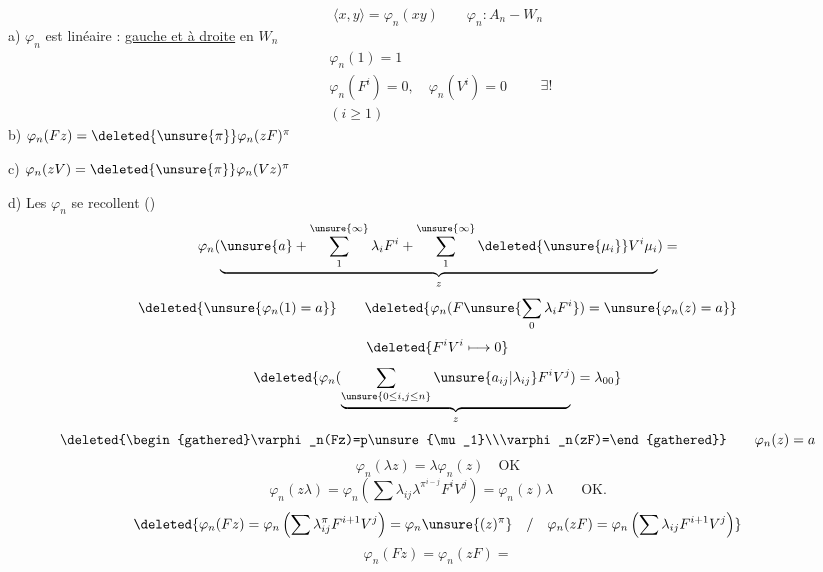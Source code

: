 \[
\langle x,y\rangle=\varphi_n(xy)\qquad \varphi_n:A_n\mathbin{-}W_n
\]
a) $\varphi_n$ est  linéaire : \uline{gauche et à droite} en $W_n$
\[
\boxed{\begin{gathered}\varphi_n(1)=1\\\varphi_n(F^i)=0,\quad\varphi_n(V^i)=0\\(i\geq1)\end{gathered}}\qquad \exists!
\]
b) $\varphi_n(Fz)=\deleted{\unsure{\pi}}\varphi_n(zF)^\pi$


c) $\varphi_n(zV)=\deleted{\unsure{\pi}}\varphi_n(Vz)^\pi$

d) Les $\varphi_n$ se recollent ()
\[
\varphi_n(\underbrace{\unsure{a}+\sum_1^{\unsure{\infty}}\lambda_i F^i+\sum_1^{\unsure{\infty}}\deleted{\unsure{\mu_i}}V^i\mu_i}_{z})=
\]
\[
\deleted{\unsure{\varphi_n(1)=a}}\qquad
\deleted{\varphi_n(F\unsure{\sum_0\lambda_iF^i})=\unsure{\varphi_n(z)=a}}
\]
\[
\deleted{F^iV^i\longmapsto0}
\]
\[
\deleted{\varphi_n(\underbrace{\sum_{\unsure{0\leq i,j\leq n}}\unsure{a_{ij}|\lambda_{ij}}F^iV^j}_{z})=\lambda_{00}}
\]
\[
\deleted{\begin{gathered}\varphi_n(Fz)=p\unsure{\mu_1}\\\varphi_n(zF)=\end{gathered}}
\qquad \varphi_n(z)=a
\]
\[
\varphi_n(\lambda z)=\lambda\varphi_n(z)\quad\text{OK}
\]
\[
\varphi_n(z\lambda)=\varphi_n\left(\sum\lambda_{ij}\lambda^{\pi^{i-j}}F^iV^j\right)=\varphi_n(z)\lambda\qquad\text{OK.}
\]
\[
\deleted{\varphi_n(Fz)=\varphi_n\left(\sum\lambda_{ij}^{\pi}F^{i+1}V^j\right)=\varphi_n\unsure{(z)^\pi}\quad/\quad\varphi_n(zF)=\varphi_n\left(\sum\lambda_{ij}F^{i+1}V^j\right)}
\]
\[
\varphi_n(Fz)=\varphi_n(zF)=
\]
